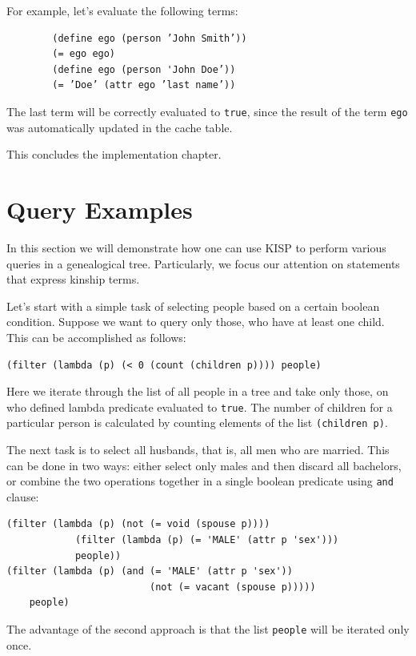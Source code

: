     For example, let’s evaluate the following terms:
    \begin{verbatim}
        (define ego (person ’John Smith’))
        (= ego ego)
        (define ego (person 'John Doe’))
        (= ’Doe’ (attr ego ’last name’))
    \end{verbatim}
    The last term will be correctly evaluated to \texttt{true}, since the result of the term \texttt{ego} was automatically
    updated in the cache table.

    This concludes the implementation chapter.

\section{Query Examples}
In this section we will demonstrate how one can use KISP to perform various queries in a genealogical tree. Particularly, we
focus our attention on statements that express kinship terms.

Let's start with a simple task of selecting people based on a certain boolean condition. Suppose we want to query only those, who
have at least one child. This can be accomplished as follows:
\begin{verbatim}
(filter (lambda (p) (< 0 (count (children p)))) people)
\end{verbatim}
Here we iterate through the list of all people in a tree and take only those, on who defined lambda predicate evaluated to
\texttt{true}. The number of children for a particular person is calculated by counting elements of the list \texttt{(children
p)}.

The next task is to select all husbands, that is, all men who are married. This can be done in two ways: either select only
males and then discard all bachelors, or combine the two operations together in a single boolean predicate using \texttt{and}
clause:
\begin{verbatim}
(filter (lambda (p) (not (= void (spouse p))))
            (filter (lambda (p) (= 'MALE' (attr p 'sex')))
            people))
(filter (lambda (p) (and (= 'MALE' (attr p 'sex'))
                         (not (= vacant (spouse p)))))
    people)
\end{verbatim}
The advantage of the second approach is that the list \texttt{people} will be iterated only once.

